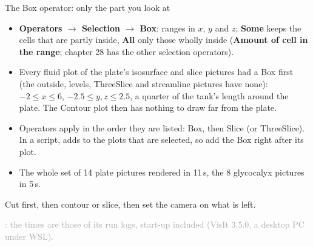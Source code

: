 \documentclass[aspectratio=169,11pt]{beamer}
\newcommand{\sourcecredit}[1]{\vfill\begin{flushright}\tiny\textcolor{DarkGray}{#1}\end{flushright}}
\newcommand{\gui}[1]{\textsf{\textbf{#1}}}
\begin{document}
\begin{frame}{The Box operator: only the part you look at}
\label{fr:box}
\footnotesize
\begin{itemize}
  \item \gui{Operators $\to$ Selection $\to$ Box}: ranges in $x$, $y$ and $z$; \gui{Some} keeps the cells that are partly inside, \gui{All} only those wholly inside (\gui{Amount of cell in the range}; chapter 28 has the other selection operators).
  \item Every fluid plot of the plate's isosurface and slice pictures had a Box first (the outside, levels, ThreeSlice and streamline pictures have none): $-2 \le x \le 6$, $-2.5 \le y, z \le 2.5$, a quarter of the tank's length around the plate. The Contour plot then has nothing to draw far from the plate.
  \item Operators apply in the order they are listed: Box, then Slice (or ThreeSlice). In a script,  adds to the plots that are selected, so add the Box right after its plot.
  \item The whole set of 14 plate pictures rendered in 11\,s, the 8 glycocalyx pictures in 5\,s.
\end{itemize}
\begin{punchbox}
\small Cut first, then contour or slice, then set the camera on what is left.
\end{punchbox}
\sourcecredit{: the times are those of its run logs, start-up included (VisIt 3.5.0, a desktop PC under WSL).}
\end{frame}
\end{document}
